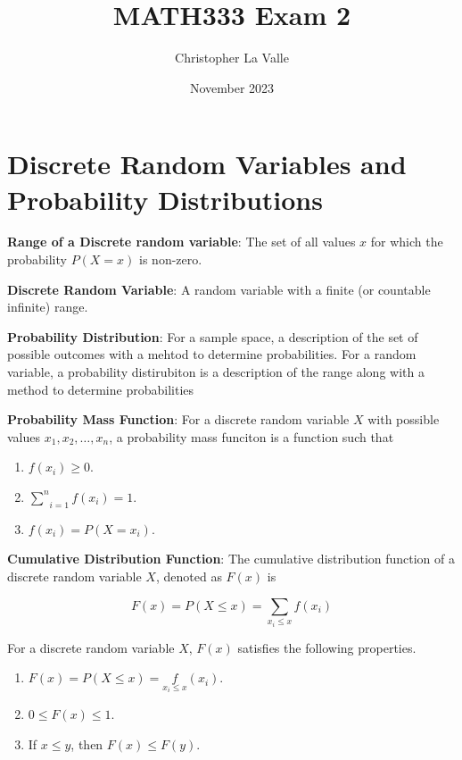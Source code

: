 \documentclass{article}
\title{MATH333 Exam 2}
\author{Christopher La Valle}
\date{November 2023}
\begin{document}
\maketitle

\tableofcontents

\section{Discrete Random Variables and Probability Distributions}

\noindent\textbf{\color{blue}Range of a Discrete random variable}: The set of all values $x$ for which the probability $P(X=x)$ is non-zero.

\noindent\textbf{\color{blue}Discrete Random Variable}: A random variable with a finite (or countable infinite) range.

\noindent\textbf{\color{blue}Probability Distribution}: For a sample space, a description of the set of possible outcomes with a mehtod to determine probabilities. For a random variable, a probability distirubiton is a description of the range along with a method to determine probabilities

\noindent\textbf{\color{blue}Probability Mass Function}: For a discrete random variable $X$ with possible values $x_1,x_2,\ldots,x_n$, a probability mass funciton is a function such that

\begin{enumerate}
    \item $f(x_i)\ge0$.
    \item $\underset{i=1}{\overset{n}{\sum}}f(x_i)=1$.
    \item $f(x_i)=P(X=x_i)$.
\end{enumerate}

\noindent\textbf{\color{blue}Cumulative Distribution Function}: The cumulative distribution function of a discrete random variable $X$, denoted as $F(x)$ is 

$$F(x)=P(X\le x)=\underset{x_i\le x}{\sum}f(x_i)$$

For a discrete random variable $X$, $F(x)$ satisfies the following properties.

\begin{enumerate}
    \item $F(x)=P(X\le x)=\underset{x_i\le x}f(x_i)$.
    \item $0\le F(x)\le1$.
    \item If $x\le y$, then $F(x)\le F(y)$.
\end{enumerate}
\end{document}
